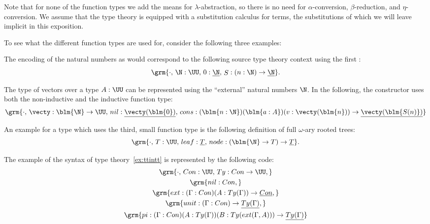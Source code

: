 Note that for none of the function types we add the means for $\lambda$-abstrac\-tion,
so there is no need for $\alpha$-conversion, $\beta$-reduction, and $\eta$-conversion.
We assume that the type theory is equipped with a substitution calculus for terms,
the substitutions of which we will leave implicit in this exposition.

\begin{example}
To see what the different function types are used for, consider the following three
examples:

The encoding of the natural numbers as would correspond to the
following source type theory context using the first :
\begin{equation*}
\grm{
\cdot,\, \N : \UU,\, 0 : \underline{\N},\, \mathop{S} : (n : \N) \to \underline{\N}
}\text{.}
\end{equation*}

The type of vectors over a type $A : \UU$ can be represented using the ``external''
natural numbers $\N$.
In the following, the constructor  uses both the non-inductive
and the inductive function type:
\begin{equation*}
\grm{
\cdot,\, \vecty : \blm{\N} \to \UU,\, \mathop{nil} : \underline{\vecty(\blm{0})},\,
	\mathop{cons} : (\blm{n : \N})(\blm{a : A})(v : \vecty(\blm{n})) \to \underline{\vecty(\blm{S(n)})}
}
\end{equation*}

An example for a type which uses the third, small function type is the following
definition of full $\omega$-ary rooted trees:
\begin{equation*}
\grm{
\cdot,\, T : \UU,\, \mathop{leaf} : \underline{T},\,
	\mathop{node} : (\blm{\N} \to T) \to \underline{T}
} \text{.}
\end{equation*}
\end{example}

\begin{example}
The example of the syntax of type theory~\ref{ex:ttintt} is represented by the
following code:
\begin{multline*}
\grm{\cdot,\, \mathop{Con} : \UU,\, \mathop{Ty} : \mathop{Con} \to \UU,} \\
\grm{\mathop{nil} : \mathop{Con},} \\
\grm{\mathop{ext} : (\Gamma : \mathop{Con})(A : \mathop{Ty}(\Gamma)) \to \underline{\mathop{Con}},} \\
\grm{\mathop{unit} : (\Gamma : \mathop{Con}) \to \underline{\mathop{Ty}(\Gamma)},} \\
\grm{\mathop{pi} : (\Gamma : \mathop{Con})(A : \mathop{Ty}(\Gamma))(B : \mathop{Ty}(\mathop{ext}(\Gamma, A))) \to \underline{\mathop{Ty}(\Gamma)}}
\end{multline*} %
\end{example}

